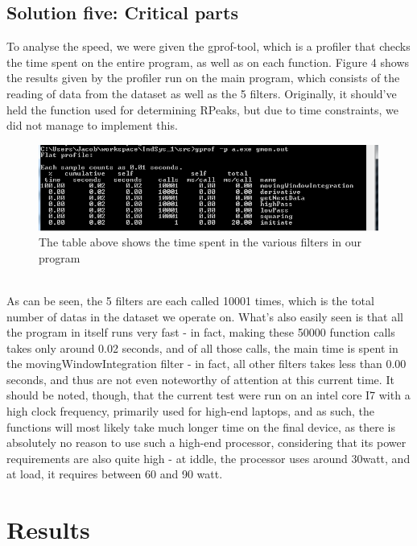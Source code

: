 \documentclass[12pt,a4paper]{article}
\begin{document}
\subsection{Solution five: Critical parts}
To analyse the speed, we were given the gprof-tool, which is a profiler that checks the time spent on the entire program, as well as on each function. Figure 4 shows the results given by the profiler run on the main program, which consists of the reading of data from the dataset as well as the 5 filters. Originally, it should've held the function used for determining RPeaks, but due to time constraints, we did not manage to implement this.\\
\begin{figure}[h!]
  \centering
   \includegraphics[width=1\textwidth]{results_time.png}
  \caption{The table above shows the time spent in the various filters in our program}
\end{figure}
\\
As can be seen, the 5 filters are each called 10001 times, which is the total number of datas in the dataset we operate on. What's also easily seen is that all the program in itself runs very fast - in fact, making these 50000 function calls takes only around 0.02 seconds, and of all those calls, the main time is spent in the movingWindowIntegration filter - in fact, all other filters takes less than 0.00 seconds, and thus are not even noteworthy of attention at this current time. It should be noted, though, that the current test were run on an intel core I7 with a high clock frequency, primarily used for high-end laptops, and as such, the functions will most likely take much longer time on the final device, as there is absolutely no reason to use such a high-end processor, considering that its power requirements are also quite high - at iddle, the processor uses around 30watt, and at load, it requires between 60 and 90 watt\cite{power consumption}.

\section{Results}
\end{document}
